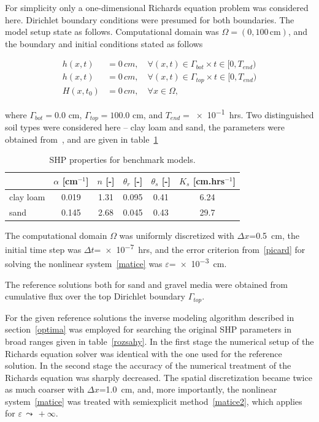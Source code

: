 \documentclass[review,times,3p,twocolumn,10pt]{elsarticle}
\newenvironment{lineq}
    {\begin{linenomath*}
    \begin{equation}
    }
    { 
    \end{equation} 
    \end{linenomath*}
    }
\newcommand{\fs}{\footnotesize}
\begin{document}
 For simplicity only a one-dimensional Richards equation problem was considered here.  Dirichlet boundary conditions were presumed for both boundaries. The model setup state as follows. Computational domain was $\Omega=(0,100\,\mathrm{cm})$, and the boundary and initial conditions stated as follows
 \begin{lineq}
 \begin{split}
 h(x,t) &= 0\, cm, \quad \forall (x,t) \in \Gamma_{bot} \times  t \in [0, T_{end}) \\ 
  h(x,t) &= 0\, cm, \quad \forall (x,t) \in \Gamma_{top} \times  t \in [0, T_{end}) \\ 
  H(x,t_0) &= 0\, cm , \quad \forall x \in \Omega,
  \end{split}
\end{lineq}
 where $\Gamma_{bot}=0.0$ cm, $\Gamma_{top}=100.0$ cm, and $T_{end}=$\num{e-1}~hrs. Two distinguished soil types were considered here -- clay loam and sand, the parameters were obtained from~\citep{retc}, and are given in table~\ref{tab:bench}
 
 \begin{table}[ht]
 \begin{center}
 \caption{SHP properties for benchmark models.}
\fs
 \begin{tabular}{l||c c c c c}
  & $\alpha$  [cm$^{-1}$] & $n$ [-] & $\theta_r$ [-] & $\theta_s$  [-]  &  $K_s$ [cm.hrs$^{-1}$]  \\ \hline
 clay loam & 0.019 & 1.31 & 0.095 & 0.41 & 6.24 \\ 
 sand &  0.145 & 2.68 & 0.045 & 0.43 & 29.7 \\ \hline
 \end{tabular}
 \label{tab:bench}
 \end{center}
 \end{table}
 
 
  The computational domain $\Omega$ was uniformly discretized with $\Delta x$=0.5~cm, the initial time step was $\Delta t$=\num{e-7}~hrs, and the error criterion from~\eqref{picard} for solving the nonlinear system~\eqref{matice} was   $\varepsilon$=\num{e-3}~cm.
 
 The reference solutions both for sand and gravel media were obtained from  cumulative flux over the top Dirichlet boundary $\Gamma_{top}$.
 
For the given reference solutions the inverse modeling algorithm described in section~\ref{optima} was employed for searching the original SHP parameters in broad ranges given in table~\ref{rozsahy}. In the first stage the numerical setup of the Richards equation solver was identical with the one used for the reference solution. In the second stage the accuracy of the numerical treatment  of the Richards equation was sharply decreased. The spatial discretization became twice as much coarser with $\Delta x$=1.0~cm, and, more importantly, the nonlinear system~\eqref{matice} was treated  with semiexplicit method~\eqref{matice2}, which applies for $\varepsilon \, \leadsto \, +\infty$. 
 
\end{document}

